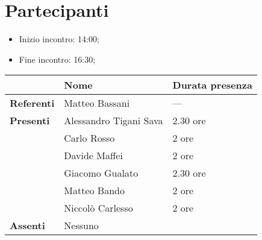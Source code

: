 \section{Partecipanti}

\begin{itemize}
    \item Inizio incontro: 14:00;
    \item Fine incontro: 16:30;
\end{itemize}


\begin{center}
{\renewcommand{\arraystretch}{1.5}
\begin{tabular}{l|ll}
	                    & \textbf{Nome}  & \textbf{Durata presenza} 	\\
	\hline
	\textbf{Referenti} & Matteo Bassani & ---\\
	
	\hline
	\textbf{Presenti}   

	& Alessandro Tigani Sava            & 2.30 ore   
	\\  & Carlo Rosso            & 2 ore  
	\\  & Davide Maffei          & 2 ore
	\\  & Giacomo Gualato        & 2.30 ore
	\\  & Matteo Bando           & 2 ore     
	\\  & Niccolò Carlesso       & 2 ore     \\
	\hline
	\textbf{Assenti}	& 	     Nessuno    &	        \\
\end{tabular}	
}
\end{center}